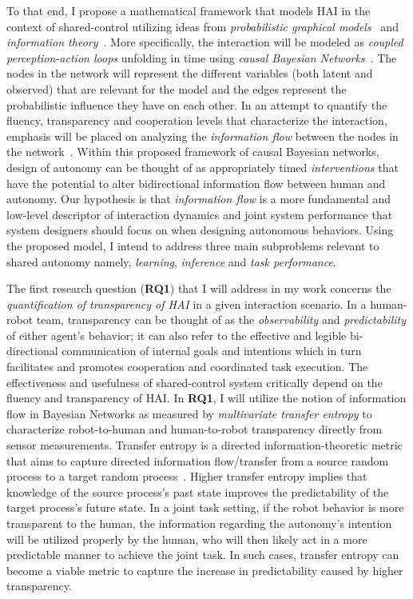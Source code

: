 \documentclass[12pt]{article}
\newcommand{\DGc}[1]{{\textbf{\color{blue}{#1}}}}
\newcommand{\POINTS}[1]{{\textbf{\color{red}{#1}}}}
\begin{document}
To that end, I propose a mathematical framework that models HAI in the context of shared-control utilizing ideas from \textit{probabilistic graphical models}~\cite{koller2009probabilistic} and \textit{information theory}~\cite{cover2012elements}. More specifically, the interaction will be modeled as \textit{coupled perception-action loops} unfolding in time using \textit{causal Bayesian Networks}~\cite{pearl2009causality}. The nodes in the network will represent the different variables (both latent and observed) that are relevant for the model and the edges represent the probabilistic influence they have on each other. In an attempt to quantify the fluency, transparency and cooperation levels that characterize the interaction, emphasis will be placed on analyzing the \textit{information flow} between the nodes in the network~\cite{ay2008information}. Within this proposed framework of causal Bayesian networks, design of autonomy can be thought of as appropriately timed \textit{interventions} that have the potential to alter bidirectional information flow between human and autonomy.
Our hypothesis is that \textit{information flow} is a more fundamental and low-level descriptor of interaction dynamics and joint system performance that system designers should focus on when designing autonomous behaviors.
Using the proposed model, I intend to address three main subproblems relevant to shared autonomy namely, \textit{learning}, \textit{inference} and \textit{task performance}.

The first research question (\textbf{RQ1}) that I will address in my work concerns the \textit{quantification of transparency of HAI} in a given interaction scenario. In a human-robot team, transparency can be thought of as the \textit{observability} and \textit{predictability} of either agent's behavior; it can also refer to the effective and legible bi-directional communication of internal goals and intentions which in turn facilitates and promotes cooperation and coordinated task execution\POINTS{REFERENCE}. The effectiveness and usefulness of shared-control system critically depend on the fluency and transparency of HAI. In \textbf{RQ1}, I will utilize the notion of information flow in Bayesian Networks as measured by \textit{multivariate transfer entropy} to characterize robot-to-human and human-to-robot transparency directly from sensor measurements.  Transfer entropy is a directed information-theoretic metric that aims to capture directed information flow/transfer from a source random process to a target random process~\cite{schreiber2000measuring}. Higher transfer entropy implies that knowledge of the source process's past state improves the predictability of the target process's future state. In a joint task setting, if the robot behavior is more transparent to the human, the information regarding the autonomy's intention will be utilized properly by the human, who will then likely act in a more predictable manner to achieve the joint task. In such cases, transfer entropy can become a viable metric to capture the increase in predictability caused by higher transparency. 
\end{document}
